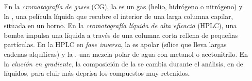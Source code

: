 \begin{definition}\label{def:b2:chromatography:techniques}
En la \emph{cromatografía de gases} (CG), la  es un gas (helio, hidrógeno
o nitrógeno) y la , una película líquida que recubre el interior de una larga columna capilar, situada
en un horno. En la \emph{cromatografía líquida de alta eficacia}
(HPLC), una bomba impulsa una  líquida a través de una columna corta rellena de pequeñas
partículas. En la HPLC en \emph{fase inversa}, la  es apolar
(sílice que lleva largas cadenas alquílicas) y la , una mezcla polar de agua con metanol o
acetonitrilo. En la \emph{elución en gradiente}, la composición de la  se
cambia durante el análisis, en  de líquidos, para eluir más deprisa los compuestos muy retenidos.
\end{definition}


